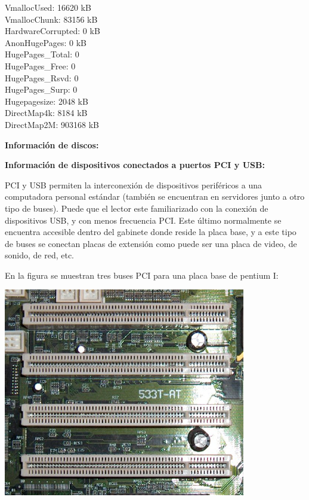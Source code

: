 \documentclass[12pt]{article}
\begin{document}
{{{{VmallocUsed:       16620 kB\\
VmallocChunk:      83156 kB\\
HardwareCorrupted:     0 kB\\
AnonHugePages:         0 kB\\
HugePages\_Total:       0\\
HugePages\_Free:        0\\
HugePages\_Rsvd:        0\\
HugePages\_Surp:        0\\
Hugepagesize:       2048 kB\\
DirectMap4k:        8184 kB\\
DirectMap2M:      903168 kB\\
}
} \vspace*{0.5cm} } } 



\textbf{Información de discos:}

\textbf{Información de dispositivos conectados a puertos PCI y USB:}

PCI y USB permiten la interconexión de dispositivos periféricos a una computadora 
personal estándar (también se encuentran en servidores junto a otro tipo de buses). 
Puede que el lector este familiarizado con la conexión de 
dispositivos USB, y con menos frecuencia PCI. Este último normalmente se encuentra 
accesible dentro del gabinete donde reside la placa base, y a este tipo de buses se
conectan placas de extensión como puede ser una placa de video, de sonido, de red, etc.   

En la figura se muestran tres buses PCI para una placa base de pentium I:

\begin{center}
 \includegraphics{Bus_pci.jpg}
\end{center}
\end{document}
